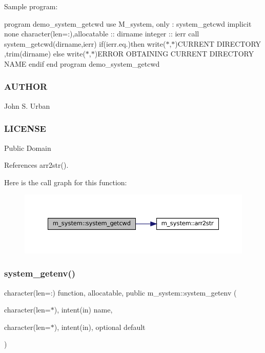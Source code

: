 Sample program\+:

program demo\+\_\+system\+\_\+getcwd use M\+\_\+system, only \+: system\+\_\+getcwd implicit none character(len=\+:),allocatable \+:\+: dirname integer \+:\+: ierr call system\+\_\+getcwd(dirname,ierr) if(ierr.\+eq.)then write($\ast$,$\ast$)\textquotesingle{}C\+U\+R\+R\+E\+NT D\+I\+R\+E\+C\+T\+O\+RY \textquotesingle{},trim(dirname) else write($\ast$,$\ast$)\textquotesingle{}E\+R\+R\+OR O\+B\+T\+A\+I\+N\+I\+NG C\+U\+R\+R\+E\+NT D\+I\+R\+E\+C\+T\+O\+RY N\+A\+ME\textquotesingle{} endif end program demo\+\_\+system\+\_\+getcwd

\subsubsection*{A\+U\+T\+H\+OR}

John S. Urban \subsubsection*{L\+I\+C\+E\+N\+SE}

Public Domain 

References arr2str().

Here is the call graph for this function\+:\nopagebreak
\begin{figure}[H]
\begin{center}
\leavevmode
\includegraphics[width=350pt]{namespacem__system_a5a32db818a9ffb0a4ea724e95356c560_cgraph}
\end{center}
\end{figure}
\mbox{\label{namespacem__system_a0f91f973a4288ebda0e75ea0869a43af}} 
\subsubsection{\texorpdfstring{system\+\_\+getenv()}{system\_getenv()}}
{\footnotesize\ttfamily character(len=\+:) function, allocatable, public m\+\_\+system\+::system\+\_\+getenv (\begin{DoxyParamCaption}\item[{character(len=$\ast$), intent(in)}]{name,  }\item[{character(len=$\ast$), intent(in), optional}]{default }\end{DoxyParamCaption})}



